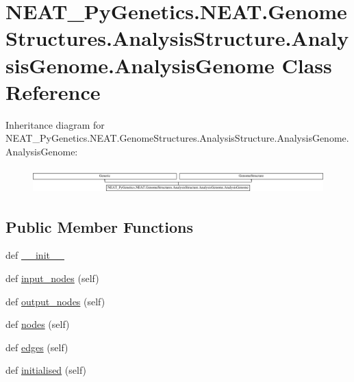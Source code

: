 \hypertarget{classNEAT__PyGenetics_1_1NEAT_1_1GenomeStructures_1_1AnalysisStructure_1_1AnalysisGenome_1_1AnalysisGenome}{}\section{N\+E\+A\+T\+\_\+\+Py\+Genetics.\+N\+E\+A\+T.\+Genome\+Structures.\+Analysis\+Structure.\+Analysis\+Genome.\+Analysis\+Genome Class Reference}
\label{classNEAT__PyGenetics_1_1NEAT_1_1GenomeStructures_1_1AnalysisStructure_1_1AnalysisGenome_1_1AnalysisGenome}
Inheritance diagram for N\+E\+A\+T\+\_\+\+Py\+Genetics.\+N\+E\+A\+T.\+Genome\+Structures.\+Analysis\+Structure.\+Analysis\+Genome.\+Analysis\+Genome\+:\begin{figure}[H]
\begin{center}
\leavevmode
\includegraphics[height=0.984183cm]{classNEAT__PyGenetics_1_1NEAT_1_1GenomeStructures_1_1AnalysisStructure_1_1AnalysisGenome_1_1AnalysisGenome}
\end{center}
\end{figure}
\subsection*{Public Member Functions}
\begin{DoxyCompactItemize}
\item 
def \hyperlink{classNEAT__PyGenetics_1_1NEAT_1_1GenomeStructures_1_1AnalysisStructure_1_1AnalysisGenome_1_1AnalysisGenome_ade327b90f0ad5077a0864d5a7dfe705e}{\+\_\+\+\_\+init\+\_\+\+\_\+}
\item 
def \hyperlink{classNEAT__PyGenetics_1_1NEAT_1_1GenomeStructures_1_1AnalysisStructure_1_1AnalysisGenome_1_1AnalysisGenome_afde7a1abfb35596b72a79b5a1119acfd}{input\+\_\+nodes} (self)
\item 
def \hyperlink{classNEAT__PyGenetics_1_1NEAT_1_1GenomeStructures_1_1AnalysisStructure_1_1AnalysisGenome_1_1AnalysisGenome_afd38f7e3e579713434e6f7ad977ace57}{output\+\_\+nodes} (self)
\item 
def \hyperlink{classNEAT__PyGenetics_1_1NEAT_1_1GenomeStructures_1_1AnalysisStructure_1_1AnalysisGenome_1_1AnalysisGenome_a249bc4c5e9cbf9f5f4e9c7c4d6dcfc4b}{nodes} (self)
\item 
def \hyperlink{classNEAT__PyGenetics_1_1NEAT_1_1GenomeStructures_1_1AnalysisStructure_1_1AnalysisGenome_1_1AnalysisGenome_a4435fda98d49756abec987840f902abb}{edges} (self)
\item 
def \hyperlink{classNEAT__PyGenetics_1_1NEAT_1_1GenomeStructures_1_1AnalysisStructure_1_1AnalysisGenome_1_1AnalysisGenome_a0fead92350d58b2f5f078e7fa54e19e0}{initialised} (self)
\end{DoxyCompactItemize}
